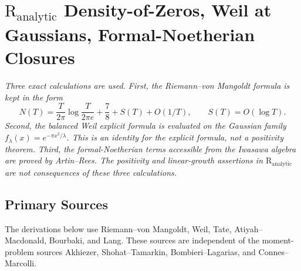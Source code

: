 \chapter{\(\mathrm{R}_{\mathrm{analytic}}\) Density-of-Zeros, Weil at Gaussians, Formal-Noetherian Closures}
\label{v4-arith:w5-i:chapter}

\emph{Three exact calculations are used. First, the Riemann--von
Mangoldt formula is kept in the form
\[
N(T)=\frac{T}{2\pi}\log\frac{T}{2\pi e}+\frac78+S(T)+O(1/T),
\qquad S(T)=O(\log T).
\]
Second, the balanced Weil explicit formula is evaluated on the
Gaussian family \(f_{\lambda}(x)=e^{-\pi x^{2}/\lambda}\). This is an
identity for the explicit formula, not a positivity theorem. Third,
the formal-Noetherian terms accessible from the Iwasawa algebra are
proved by Artin--Rees. The positivity and linear-growth assertions in
\(\mathrm{R}_{\mathrm{analytic}}\) are not consequences of these three
calculations.}

\section{Primary Sources}
\label{v4-arith:w5-i:sources}

The derivations below use Riemann--von Mangoldt, Weil, Tate,
Atiyah--Macdonald, Bourbaki, and Lang. These sources are independent of
the moment-problem sources Akhiezer, Shohat--Tamarkin,
Bombieri--Lagarias, and Connes--Marcolli.

